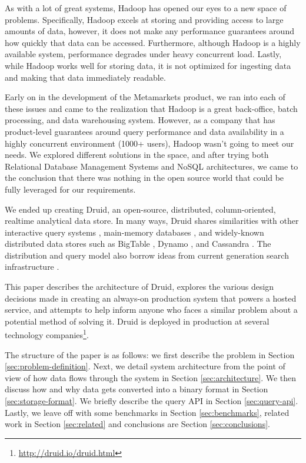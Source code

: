 \documentclass{acm_proc_article-sp}
\begin{document}
As with a lot of great systems, Hadoop has opened our eyes to a new space of
problems.  Specifically, Hadoop excels at storing and providing access to large
amounts of data, however, it does not make any performance guarantees around
how quickly that data can be accessed.  Furthermore, although Hadoop is a
highly available system, performance degrades under heavy concurrent load.
Lastly, while Hadoop works well for storing data, it is not optimized for
ingesting data and making that data immediately readable.

Early on in the development of the Metamarkets product, we ran into each of
these issues and came to the realization that Hadoop is a great back-office,
batch processing, and data warehousing system.  However, as a company that has
product-level guarantees around query performance and data availability in a
highly concurrent environment (1000+ users), Hadoop wasn't going to meet our
needs.  We explored different solutions in the space, and after
trying both Relational Database Management Systems and NoSQL architectures, we
came to the conclusion that there was nothing in the open source world that
could be fully leveraged for our requirements.

We ended up creating Druid, an open-source, distributed, column-oriented,
realtime analytical data store.  In many ways, Druid shares similarities with
other interactive query systems \cite{melnik2010dremel}, main-memory databases
\cite{farber2012sap}, and widely-known distributed data stores such as BigTable
\cite{chang2008bigtable}, Dynamo \cite{decandia2007dynamo}, and Cassandra
\cite{lakshman2010cassandra}.  The distribution and query model also
borrow ideas from current generation search infrastructure
\cite{linkedin2013senseidb, apache2013solr, banon2013elasticsearch}.

This paper describes the architecture of Druid, explores the various design
decisions made in creating an always-on production system that powers a hosted
service, and attempts to help inform anyone who faces a similar problem about a
potential method of solving it. Druid is deployed in production at several
technology
companies\footnote{\href{http://druid.io/druid.html}{http://druid.io/druid.html}}.

The structure of the paper is as follows: we first describe the problem in
Section \ref{sec:problem-definition}.  Next, we detail system architecture from
the point of view of how data flows through the system in Section
\ref{sec:architecture}.  We then discuss how and why data gets converted into a
binary format in Section \ref{sec:storage-format}.  We briefly describe the
query API in Section \ref{sec:query-api}. Lastly, we leave off with some
benchmarks in Section \ref{sec:benchmarks}, related work in Section
\ref{sec:related} and conclusions are Section \ref{sec:conclusions}.
\end{document}
